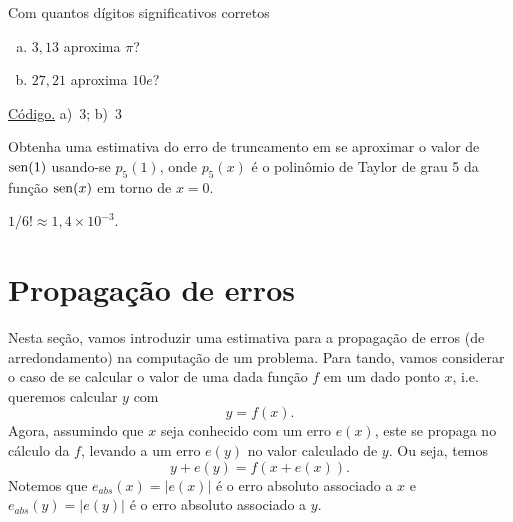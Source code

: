 \begin{exer}\label{exer:dig_corr}
  Com quantos dígitos significativos corretos
  \begin{enumerate}[a)]
  \item $3,13$ aproxima $\pi$?
  \item $27,21$ aproxima $10e$?
  \end{enumerate}
\end{exer}
\begin{resp}
  \ifisoctave 
  \href{https://github.com/phkonzen/notas/blob/master/src/MatematicaNumerica/cap_aritm/dados/exer_dig_corr/exer_dig_corr.m}{Código.} 
  \fi
  a)~$3$; b)~$3$
\end{resp}


\begin{exer}
  Obtenha uma estimativa do erro de truncamento em se aproximar o valor de $\operatorname{sen}(1)$ usando-se $p_5(1)$, onde $p_5(x)$ é o polinômio de Taylor de grau 5 da função $\operatorname{sen}(x)$ em torno de $x=0$.
\end{exer}
\begin{resp}
  $1/6! \approx 1,4\times 10^{-3}$.
\end{resp}

\section{Propagação de erros}\label{cap_aritm_sec_properros}

Nesta seção, vamos introduzir uma estimativa para a propagação de erros (de arredondamento) na computação de um problema. Para tando, vamos considerar o caso de se calcular o valor de uma dada função $f$ em um dado ponto $x$, i.e. queremos calcular $y$ com
\begin{equation}\label{eq:properros_aux1}
  y = f(x).
\end{equation}
Agora, assumindo que $x$ seja conhecido com um erro $e(x)$, este se propaga no cálculo da $f$, levando a um erro $e(y)$ no valor calculado de $y$. Ou seja, temos
\begin{equation}\label{eq:properros_aux2}
  y + e(y) = f(x+e(x)).
\end{equation}
Notemos que $e_{abs}(x) = |e(x)|$ é o erro absoluto associado a $x$ e $e_{abs}(y) = |e(y)|$ é o erro absoluto associado a $y$.

